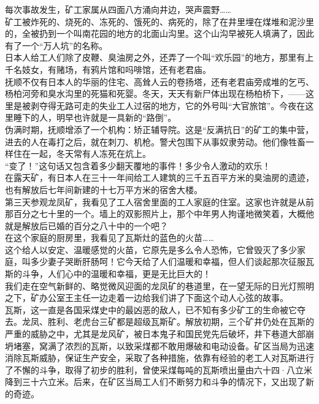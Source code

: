 每次事故发生，矿工家属从四面八方涌向井边，哭声震野……\\

矿工被炸死的、烧死的、冻死的、饿死的、病死的，除了在井里埋在煤堆和泥沙里的，全被扔到一个叫南花园的地方的北面山沟里。这个山沟早被死人填满了，因此有了一个“万人坑”的名称。\\

日本人给工人们除了皮鞭、臭油房之外，还弄了一个叫“欢乐园”的地方，那里有上千名妓女，有赌场，有鸦片馆和吗啡馆，还有老君庙。\\

抚顺不仅有日本人的华丽的住宅、高耸人云的卷扬塔，还有老君庙旁成堆的乞丐、杨柏河旁和臭水沟里的死猫和死婴。冬天，天天有新尸体出现在杨柏桥下，——这里是被剥夺得无路可走的失业工人过宿的地方，它的外号叫“大官旅馆”。今夜在这里睡下的人，明早也许就是一具新的“路倒”。\\

伪满时期，抚顺增添了一个机构：矫正辅导院。这是“反满抗日”的矿工的集中营，进去的人在毒打之后，就在刺刀、机枪。警犬包围下从事奴隶劳动。他们像牲畜一样住在一起，冬天常有人冻死在炕上。\\

“变了！”这句话又包含着多少翻天覆地的事件！多少令人激动的欢乐！\\

在露天矿，有日本人在三十一年间给工人建筑的三千五百平方米的臭油房的遗迹，也有解放后七年间新建的十七万平方米的宿舍大楼。\\

第三天参观龙凤矿，我看见了工人宿舍里面的工人家庭的住室。这家也许就是从前那百分之七十里的一个。墙上的双影照片上，那个中年男人拘谨地微笑着，大概他就是解放后已婚的百分之八十中的一个吧？\\

在这个家庭的厨房里，我看见了瓦斯灶的蓝色的火苗……\\

这个给人以安定、温暖感觉的火苗，它原先是多么令人恐怖，它曾毁灭了多少家庭，叫多少妻子哭断肝肠呵！它今天给了人们温暖和幸福，但人们谈起那次征服瓦斯的斗争，人们心中的温暖和幸福，更是无比巨大的！\\

我们走在空气新鲜的、略觉微风迎面的龙凤矿的巷道里，在一望无际的日光灯照明之下，矿办公室王主任一边走着一边给我们讲了下面这个动人心弦的故事。\\

瓦斯，这一直是各国采煤史中的最凶恶的敌人，已不知有多少矿工的生命被它夺去。龙凤、胜利、老虎台三矿都是超级瓦斯矿。解放初期，三个矿井仍处在瓦斯的严重的威胁之中，尤其是龙风矿，被日本鬼子和国民党先后破坏，井下巷道大部崩坍堵塞，窝满了浓烈的瓦斯，以致采煤都不敢用爆破和电动设备。矿区当局为迅速消除瓦斯威胁，保证生产安全，采取了各种措施，依靠有经验的老工人对瓦斯进行了不懈的斗争，取得了初步的胜利，曾使采煤每吨的瓦斯喷出量由六十四·八立米降到三十六立米。后来，在矿区当局工人们不断努力和斗争的情况下，又出现了新的奇迹。\\

